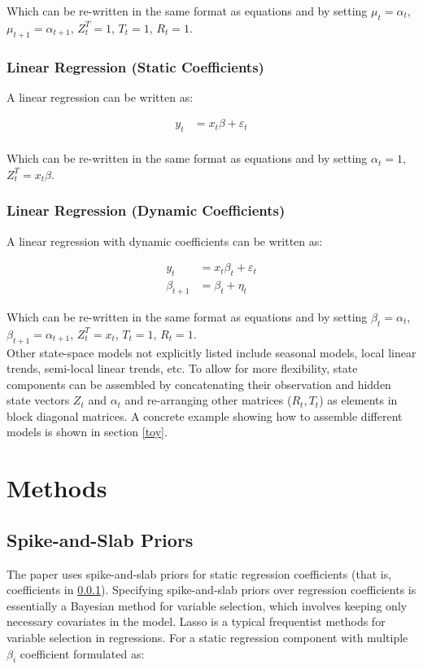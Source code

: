 \documentclass[12pt]{article}
\begin{document}
Which can be re-written in the same format as equations \label{eq} and \label{eq1} by setting $\mu_t = \alpha_t$, $\mu_{t+1} = \alpha_{t+1}$, $Z_t^T = 1$, $T_t = 1$, $R_t = 1$.

\subsubsection{Linear Regression (Static Coefficients)}\label{linreg}
A linear regression can be written as:

\begin{align}
    y_{t} &= x_t\beta + \varepsilon_t\\
\end{align}

Which can be re-written in the same format as equations \label{eq} and \label{eq1} by setting $\alpha_t=1$,  $Z_t^T = x_t\beta$.

\subsubsection{Linear Regression (Dynamic Coefficients)}
A linear regression with dynamic coefficients can be written as:

\begin{align}
    y_{t} &= x_t\beta_t + \varepsilon_t\\
    \beta_{t+1} &= \beta_t + \eta_t
\end{align}

Which can be re-written in the same format as equations \label{eq} and \label{eq1} by setting $\beta_t = \alpha_t$, $\beta_{t+1}=\alpha_{t+1}$, $Z_t^T = x_t$, $T_t = 1$, $R_t = 1$.\\

Other state-space models not explicitly  listed include seasonal models, local linear trends, semi-local linear trends, etc. To allow for more flexibility, state components can be assembled by concatenating their observation and hidden state vectors $Z_t$ and $\alpha_t$ and re-arranging other matrices ($R_t, T_t$) as elements in block diagonal matrices. A concrete example showing how to assemble different models is shown in section \ref{toy}.




\section{Methods}
\subsection{Spike-and-Slab Priors}
The paper uses spike-and-slab priors for static regression coefficients (that is, coefficients in \ref{linreg}). Specifying spike-and-slab priors over regression coefficients is essentially a Bayesian method for variable selection, which involves keeping only necessary covariates in the model. Lasso is a typical frequentist methods for variable selection in regressions. For a static regression component with multiple $\beta_i$ coefficient formulated as:
\end{document}

